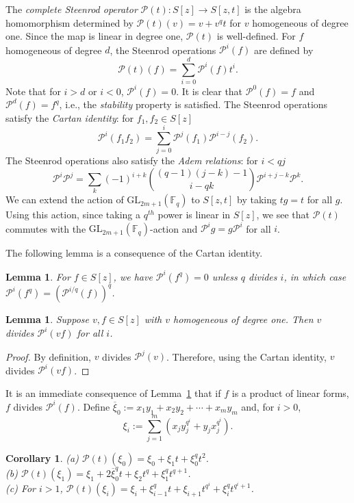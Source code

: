 \documentclass{amsart}
\newtheorem{lemma}[subsection]{Lemma}
\newtheorem{cor}[subsection]{Corollary}
\newcommand{\field}{\mathbb{F}}
\newcommand{\gl}[2]{{{\text{GL}_{{#1}}(\field_{#2})}}}
\newcommand{\PP}{\mathcal{P}}
\begin{document}
The {\it complete Steenrod operator} $\PP(t):S[z]\to S[z,t]$ is the algebra homomorphism determined by $\PP(t)(v)=v+v^q t$ for $v$ homogeneous of degree one. Since the map is linear in degree one, $\PP(t)$ is well-defined. For $f$ homogeneous of degree $d$, the Steenrod operations 
$\PP^i(f)$ are defined by
$$\PP(t)(f)=\sum_{i=0}^d\PP^i(f)t^i.$$
Note that for $i>d$ or $i<0$, $\PP^i(f)=0$.
It is clear that $\PP^0(f)=f$ and $\PP^d(f)=f^q$,
i.e., the {\it stability} property is satisfied.
The Steenrod operations satisfy the {\it Cartan identity}:
for $f_1,f_2\in S[z]$
$$\PP^i(f_1f_2)=\sum_{j=0}^i \PP^{j}(f_1)\PP^{i-j}(f_2).$$
The Steenrod operations also satisfy the {\it Adem relations}: 
for $i<qj$
$$\PP^i\PP^j=\sum_k (-1)^{i+k}
\binom{(q-1)(j-k) -1}{i-qk}\PP^{i+j-k}\PP^{k}.$$
We can extend the action of $\gl{2m+1}{q}$ to $S[z,t]$
by taking $tg=t$ for all $g$. Using this action,
since taking a $q^{th}$ power is linear in $S[z]$, 
we see that $\PP(t)$ commutes with the $\gl{2m+1}{q}$-action
and $\PP^ig=g\PP^i$ for all $i$.


The following lemma is a consequence of the Cartan identity.

\begin{lemma} For $f\in S[z]$, we have $\PP^i(f^q)=0$ unless $q$ divides $i$,
in which case $\PP^i(f^q)=(\PP^{i/q}(f))^q$.
\end{lemma}

\begin{lemma}\label{steenrod on linear forms}
    Suppose $v,f\in S[z]$ with $v$ homogeneous of degree one.
    Then $v$ divides $\PP^i(vf)$ for all $i$.
\end{lemma}
\begin{proof}
    By definition, $v$ divides $\PP^j(v)$. Therefore, using the Cartan identity, $v$ divides $\PP^i(vf)$.
\end{proof}

It is an immediate consequence of Lemma~\ref{steenrod on linear forms} that if $f$ is a product of linear forms, $f$ divides $\PP^i(f)$.
Define $\overline{\xi}_0:=x_1y_1+x_2y_2+\cdots +x_my_m$
and, for $i>0$, $$\xi_i:=\sum_{j=1}^m (x_jy_j^{q^i}+y_jx_j^{q^i}).$$

 \begin{cor} \label{com_st}(a) $\PP(t)(\xi_0)=\xi_0+\xi_1 t+\xi_0^q t^2$.\\
 (b) $\PP(t)(\xi_1)=\xi_1+2\overline{\xi}_0^q t+\xi_2 t^q+\xi_1^q t^{q+1}$.\\
 (c) For $i>1$, 
 $\PP(t)(\xi_i)=\xi_i+\xi_{i-1}^q t+\xi_{i+1} t^{q^i}+\xi_i^q t^{q^i+1}$.
 \end{cor}
\end{document}

